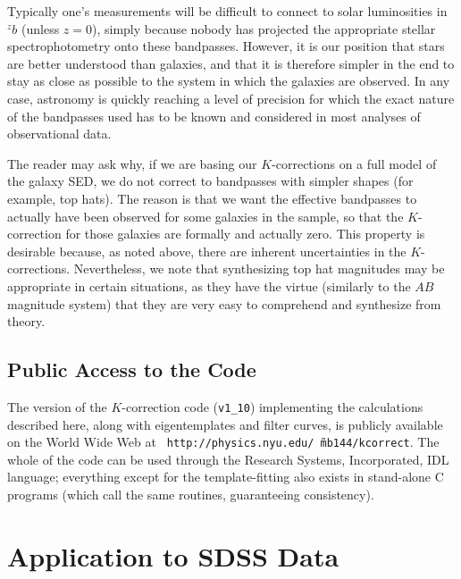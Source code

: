 \documentclass[10pt,preprint]{aastex}
\newcommand{\band}[2]{\ensuremath{^{{#1}}\!{#2}}}
\newcommand{\kversion}{{\tt v1\_10}}
\begin{document}
Typically one's measurements will be difficult to connect to solar
luminosities in $\band{z}{b}$ (unless $z=0$), simply because nobody
has projected the appropriate stellar spectrophotometry onto these
bandpasses. However, it is our position that stars are better
understood than galaxies, and that it is therefore simpler in the end
to stay as close as possible to the system in which the galaxies are
observed. In any case, astronomy is quickly reaching a level of
precision for which the exact nature of the bandpasses used has to be
known and considered in most analyses of observational data.

The reader may ask why, if we are basing our $K$-corrections on a full
model of the galaxy SED, we do not correct to bandpasses with simpler
shapes (for example, top hats). The reason is that we want the effective
bandpasses to actually have been observed for some galaxies in the
sample, so that the $K$-correction for those galaxies are formally and
actually zero. This property is desirable because, as noted above,
there are inherent uncertainties in the $K$-corrections. Nevertheless,
we note that synthesizing top hat magnitudes may be appropriate in
certain situations, as they have the virtue (similarly to the $AB$
magnitude system) that they are very easy to comprehend and synthesize
from theory.

\subsection{Public Access to the Code}

The version of the $K$-correction code (\kversion) implementing the
calculations described here, along with eigentemplates and filter
curves, is publicly available on the World Wide Web at {\tt
http://physics.nyu.edu/\~\ mb144/kcorrect}.  The whole of the code can
be used through the Research Systems, Incorporated, IDL language;
everything except for the template-fitting also exists in stand-alone
C programs (which call the same routines, guaranteeing consistency).

\section{Application to SDSS Data}
\label{data}
\end{document}
